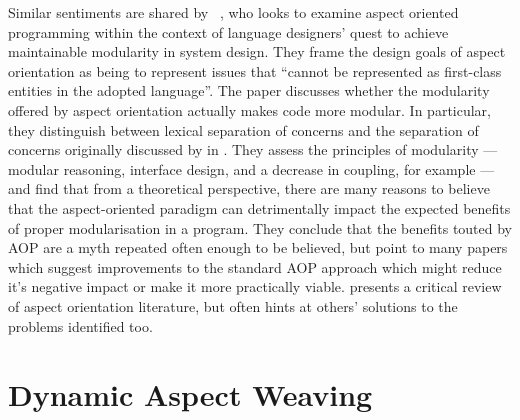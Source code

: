 Similar sentiments are shared by
\citeauthor{przybylek2010wrong}~\cite{przybylek2010wrong}, who looks to examine aspect oriented
programming within the context of language designers' quest to achieve
maintainable modularity in system design. They frame the design goals of aspect
orientation as being to represent issues that ``cannot be represented as
first-class entities in the adopted language''. The paper discusses whether the
modularity offered by aspect orientation actually makes code more modular. In
particular, they distinguish between lexical separation of concerns and the
separation of concerns originally discussed by
\citeauthor{djikstra_scientific_thought} in
. They assess the principles of
modularity --- modular reasoning, interface design, and a decrease in coupling,
for example --- and find that from a theoretical perspective, there are many
reasons to believe that the aspect-oriented paradigm can detrimentally impact
the expected benefits of proper modularisation in a program. They conclude that
the benefits touted by AOP are a myth repeated often enough to be believed, but
point to many papers which suggest improvements to the standard AOP approach
which might reduce it's negative impact or make it more practically viable.
\citeauthor{przybylek2010wrong} presents a critical review of aspect orientation
literature, but often hints at others' solutions to the problems identified too.




\section{Dynamic Aspect Weaving}\label{sec:dynamic_aop_review}


